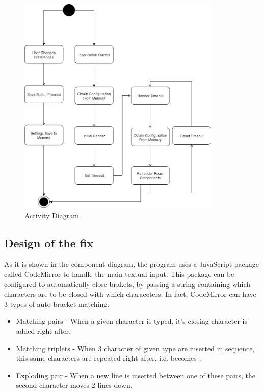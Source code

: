 \begin{figure}
\centering
\includegraphics[height=4.16667in]{../activityDiagram.png}
\caption{Activity Diagram}
\end{figure}

\subsection{Design of the fix}\label{design-of-the-fix}

As it is shown in the component diagram, the program uses a JavaScript
package called CodeMirror to handle the main textual input. This package
can be configured to automatically close brakets, by passing a string
containing which characters are to be closed with which characeters. In
fact, CodeMirror can have 3 types of auto bracket matching:

\begin{itemize}
\item
  Matching pairs - When a given character is typed, it's closing
  character is added right after.
\item
  Matching triplets - When 3 character of given type are inserted in
  sequence, this same characters are repeated right after, i.e.
  \texttt{\textquotesingle{}\textquotesingle{}\textquotesingle{}}
  becomes
  \texttt{\textquotesingle{}\textquotesingle{}\textquotesingle{}\textquotesingle{}\textquotesingle{}\textquotesingle{}}.
\item
  Exploding pair - When a new line is inserted between one of these
  pairs, the second character moves 2 lines down.
\end{itemize}

